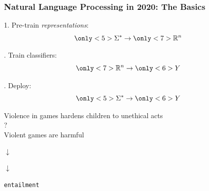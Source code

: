 \documentclass[t,xcolor={svgnames,table}]{beamer}
\begin{document}
\begin{frame}
\frametitle{Natural Language Processing in 2020: The Basics}
{
1. Pre-train {\only<7>{\color{red}}\textit{representations}}:
\[{\Sigma^*}\to{\only<7>{\color{red}}\mathbb{R}^n}\]

. Train classifiers:
\[{\only<7>{\color{red}}\mathbb{R}^n}\to {\only<6>{\color{red}}Y}\]

. Deploy:
\[{\only<5>{\color{red}}\Sigma^*}\to {\only<6>{\color{red}}Y}\]

\pause
  \begin{center}
  \begin{adjustbox}{padding=1ex 1ex 1ex 1ex,frame,margin=1ex 1ex 1ex 1ex,minipage=[r][6ex][b]{.7\textwidth}}
  	\centering\rm{}\small
  	Violence in games hardens children to unethical acts \\ ? \\ Violent games are harmful
  \end{adjustbox}
  
  $\downarrow$
  
  {
  }
  
  $\downarrow$
  
  {\tt{}entailment}
  \end{center}
}
\end{frame}

\newcommand{\mask}[2]{\alt<#1>{\fbox{\textbf{\color{red}?}}}{#2}}
\end{document}
